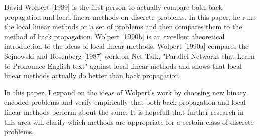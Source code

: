 	David Wolpert [1989] is the first person to actually compare
both back propagation and local linear methods on discrete problems.
In this paper, he runs the local linear methods on a set of problems
and then compares them to the method of back propagation.  Wolpert
[1990b] is an excellent theoretical introduction to the ideas of local
linear methods.  Wolpert [1990a] compares the Sejnowski and Rosenberg
[1987] work on Net Talk, "Parallel Networks that Learn to Pronounce
English text" against local linear methods and shows that local linear
methods actually do better than back propagation.

	In this paper, I expand on the ideas of Wolpert's work by
choosing new binary encoded problems and verify empirically that both
back propagation and local linear methods perform about the same.  It
is hopefull that further research in this area will clarify which
methods are appropriate for a certain class of discrete problems.


